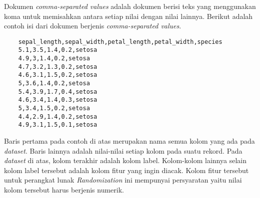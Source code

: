 Dokumen \textit{comma-separated values} adalah dokumen berisi teks yang menggunakan koma untuk memisahkan antara setiap nilai dengan nilai lainnya. Berikut adalah contoh isi dari dokumen berjenis \textit{comma-separated values}.
\begin{verbatim}
	sepal_length,sepal_width,petal_length,petal_width,species
	5.1,3.5,1.4,0.2,setosa
	4.9,3,1.4,0.2,setosa
	4.7,3.2,1.3,0.2,setosa
	4.6,3.1,1.5,0.2,setosa
	5,3.6,1.4,0.2,setosa
	5.4,3.9,1.7,0.4,setosa
	4.6,3.4,1.4,0.3,setosa
	5,3.4,1.5,0.2,setosa
	4.4,2.9,1.4,0.2,setosa
	4.9,3.1,1.5,0.1,setosa
\end{verbatim}
Baris pertama pada contoh di atas merupakan nama semua kolom yang ada pada \textit{dataset}. Baris lainnya adalah nilai-nilai setiap kolom pada suatu rekord. Pada \textit{dataset} di atas, kolom terakhir adalah kolom label. Kolom-kolom lainnya selain kolom label tersebut adalah kolom fitur yang ingin diacak. Kolom fitur tersebut untuk perangkat lunak \textit{Randomization} ini mempunyai persyaratan yaitu nilai kolom tersebut harus berjenis numerik.

